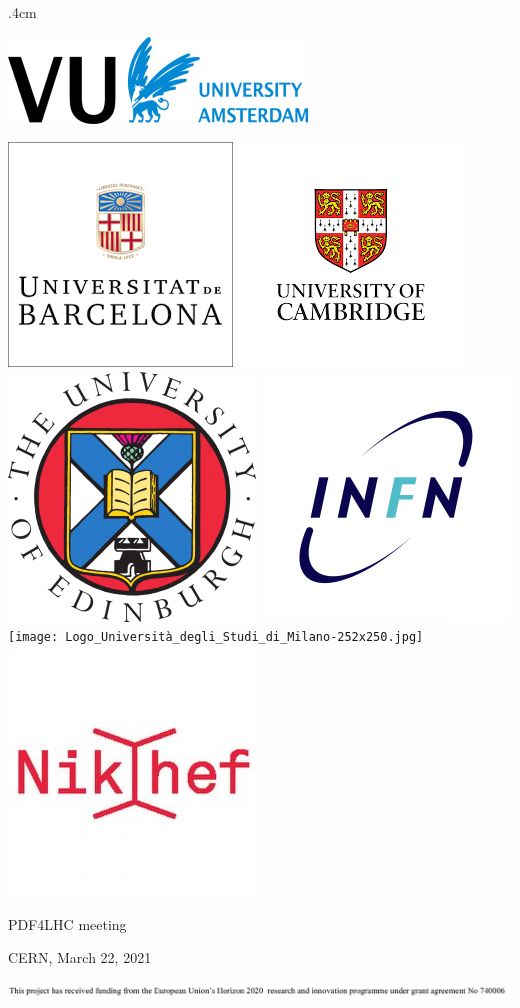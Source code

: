 \documentclass[a4,landscape]{seminar}
\newcommand{\1}{1\!\!\!1}
\begin{document}
\begin{slide}
\begin{center}
\vglue.4cm
\begin{minipage}{.16\linewidth}\includegraphics[width=\linewidth]{VUamsterdam-300x87.png}\\\vspace{1.cm}\end{minipage}
\includegraphics[width=.115\linewidth]{UB.png}
\includegraphics[width=.13\linewidth]{cambridge.png}
\includegraphics[width=.116\linewidth]{university-of-edinburgh-logo-248x250.png}
\includegraphics[width=.12\linewidth]{infn-250x250.png}
\texttt{[image: Logo\_Università\_degli\_Studi\_di\_Milano-252x250.jpg]}
\includegraphics[width=.12\linewidth]{nikhef-250x250.jpg}
\\ \vspace{-1.cm}
\begin{minipage}{.49\linewidth}
\begin{flushleft}
  \vspace{.5cm}
{PDF4LHC meeting}
\end{flushleft}
\end{minipage}
\begin{minipage}{.49\linewidth}
\begin{flushright}
\vspace{.5cm}
{CERN, March 22, 2021} 
\end{flushright}
\end{minipage}
\includegraphics[width=.7\linewidth]{funding.png}
\end{center}
\end{slide}
\end{document}
